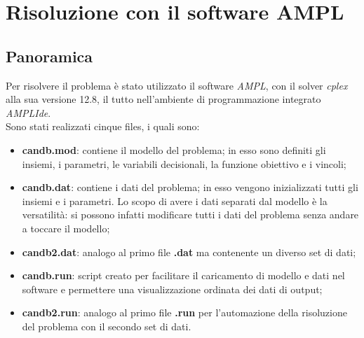 \newpage
\section{Risoluzione con il software AMPL}
\subsection{Panoramica}
Per risolvere il problema è stato utilizzato il software \textit{AMPL}, con il solver \textit{cplex} alla sua versione 12.8, il tutto nell'ambiente di programmazione integrato \textit{AMPLIde}. \\
Sono stati realizzati cinque files, i quali sono:
\begin{itemize}
\item \textbf{candb.mod}: contiene il modello del problema; in esso sono definiti gli insiemi, i parametri, le variabili decisionali, la funzione obiettivo e i vincoli;
\item \textbf{candb.dat}: contiene i dati del problema; in esso vengono inizializzati tutti gli insiemi e i parametri. Lo scopo di avere i dati separati dal modello è la versatilità: si possono infatti modificare tutti i dati del problema senza andare a toccare il modello;
\item \textbf{candb2.dat}: analogo al primo file \textbf{.dat} ma contenente un diverso set di dati;
\item \textbf{candb.run}: script creato per facilitare il caricamento di modello e dati nel software e permettere una visualizzazione ordinata dei dati di output;
\item \textbf{candb2.run}: analogo al primo file \textbf{.run} per l'automazione della risoluzione del problema con il secondo set di dati.
\end{itemize}

